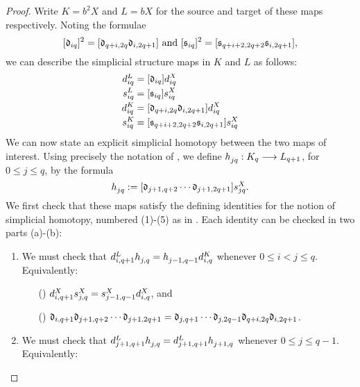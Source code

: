 \documentclass[11pt]{amsart}
\theoremstyle{plain}
\begin{document}
\begin{proof}
Write $K=b^{2}X$ and $L=bX$ for the source and target of these maps respectively. Noting the formulae
\[[\frakd_{iq}]^2= [\frakd_{q+i,2q}\circ\frakd_{i,2q+1}]\ \textup{and}\  [\fraks_{iq}]^2= [\fraks_{q+i+2,2q+2}\circ\fraks_{i,2q+1}],\]
we can describe the simplicial structure maps in $K$ and $L$ as follows:
\begin{alignat*}{2}
\trip{d}{iq}{L}&=[\frakd_{iq}]\trip{d}{iq}{X}\\
\trip{s}{iq}{L}&=[\fraks_{iq}]\trip{s}{iq}{X}\\
\trip{d}{iq}{K}&=[\frakd_{q+i,2q}\circ\frakd_{i,2q+1}]\trip{d}{iq}{X}\\
\trip{s}{iq}{K}&=[\fraks_{q+i+2,2q+2}\circ\fraks_{i,2q+1}]\trip{s}{iq}{X}
\end{alignat*}
We can now state an explicit simplicial homotopy between the two maps of interest. Using precisely the notation of \cite[\S5]{MaySimpObj.pdf}, we define ${h}_{\smash{jq}}^{\smash{}}:K_q\longrightarrow L_{q+1}$, for $0\leq j\leq q$, by the formula
\[\trip{h}{jq}{}:=[\frakd_{j+1,q+2}\circ\cdots \circ\frakd_{j+1,2q+1}]\trip{s}{jq}{X}.\]
We first check that these maps satisfy the defining identities for the notion of simplicial homotopy, numbered (1)-(5) as in \cite[\S5]{MaySimpObj.pdf}. Each identity can be checked in two parts (a)-(b):
{\renewcommand{\circ}{\relax}
\begin{enumerate}\squishlist
\setlength{\parindent}{.25in}
\item We must check that $\trip{d}{i,q+1}{L}\circ \trip{h}{j,q}{}=\trip{h}{j-1,q-1}{}\circ \trip{d}{i,q}{K}$ whenever $0\leq i<j\leq q$. Equivalently:
\begin{enumerate}\squishlist
\setlength{\parindent}{.25in}
\item[({\makebox[.51em][c]{a}})] $\trip{d}{i,q+1}{X}\circ \trip{s}{j,q}{X}=\trip{s}{j-1,q-1}{X}\circ \trip{d}{i,q}{X}$,\textup{ and}%
\item[({\makebox[.51em][c]{b}})]
$\frakd_{i,q+1}\circ
\frakd_{j+1,q+2}\circ\cdots \circ\frakd_{j+1,2q+1}=
\frakd_{j,q+1}\circ\cdots \circ\frakd_{j,2q-1}\circ
\frakd_{q+i,2q}\circ\frakd_{i,2q+1}$.
\end{enumerate}
\item We must check that $\trip{d}{j+1,q+1}{L}\circ \trip{h}{j,q}{}=\trip{d}{j+1,q+1}{L}\circ \trip{h}{j+1,q}{}$ whenever $0\leq j\leq q-1$. Equivalently:
\begin{enumerate}\squishlist

\end{enumerate}
\end{enumerate}}
\end{proof}
\end{document}
